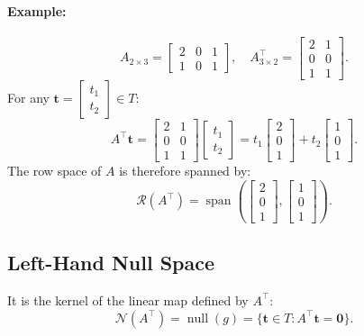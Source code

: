 \documentclass{article}
\begin{document}
\paragraph*{Example:}
\[
A_{2 \times 3} = \begin{bmatrix}
    2 & 0 & 1 \\
    1 & 0 & 1
\end{bmatrix}, \quad
A^\top_{3 \times 2} = \begin{bmatrix}
    2 & 1 \\
    0 & 0 \\
    1 & 1
\end{bmatrix}.
\]
For any \( \mathbf{t} = \begin{bmatrix} t_1 \\ t_2 \end{bmatrix} \in T \):
\[
A^\top \mathbf{t} = \begin{bmatrix}
    2 & 1 \\
    0 & 0 \\
    1 & 1
\end{bmatrix}
\begin{bmatrix}
    t_1 \\
    t_2
\end{bmatrix}
= t_1\begin{bmatrix}
    2 \\
    0 \\
    1
\end{bmatrix} 
+ 
t_2\begin{bmatrix}
    1 \\
    0 \\
    1
\end{bmatrix}.
\]
The row space of \( A \) is therefore spanned by:
\[
\mathcal{R}(A^\top) = \operatorname{span}\left( 
    \begin{bmatrix}2 \\ 0 \\ 1\end{bmatrix}, 
    \begin{bmatrix}1 \\ 0 \\ 1\end{bmatrix} 
\right).
\]

\subsection{Left-Hand Null Space}
It is the kernel of the linear map defined by \( A^\top \):
\[
\mathcal{N}(A^\top) = \operatorname{null}(g) = \{ \mathbf{t} \in T : A^\top \mathbf{t} = \mathbf{0} \}.
\]
\end{document}
